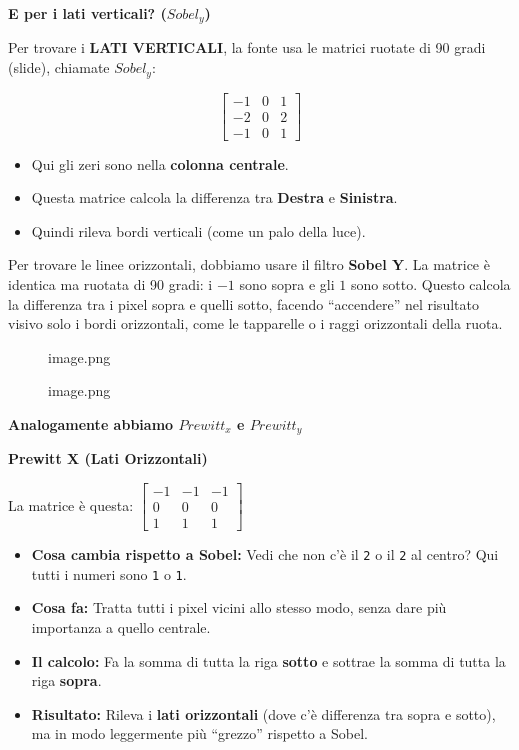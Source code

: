 \documentclass[
]{article}
\providecommand{\tightlist}{%
  \setlength{\itemsep}{0pt}\setlength{\parskip}{0pt}}
\begin{document}
\textbf{E per i lati verticali? (\(Sobel_y\))}

Per trovare i \textbf{LATI VERTICALI}, la fonte usa le matrici ruotate di 90 gradi (slide), chiamate \(Sobel_y\):

\[
\begin{bmatrix}
-1 & 0 & 1 \\
-2 & 0 & 2 \\
-1 & 0 & 1
\end{bmatrix}
\]

\begin{itemize}
\tightlist
\item
  Qui gli zeri sono nella \textbf{colonna centrale}.
\item
  Questa matrice calcola la differenza tra \textbf{Destra} e \textbf{Sinistra}.
\item
  Quindi rileva bordi verticali (come un palo della luce).
\end{itemize}

Per trovare le linee orizzontali, dobbiamo usare il filtro \textbf{Sobel Y}. La matrice è identica ma ruotata di 90 gradi: i \(-1\) sono sopra e gli \(1\) sono sotto. Questo calcola la differenza tra i pixel sopra e quelli sotto, facendo ``accendere'' nel risultato visivo solo i bordi orizzontali, come le tapparelle o i raggi orizzontali della ruota.

\begin{figure}
\centering
{image.png}
\caption{image.png}
\end{figure}

\textbf{Analogamente abbiamo \(Prewitt_x\) e \(Prewitt_y\)}

\textbf{Prewitt X (Lati Orizzontali)}

La matrice è questa: \(\begin{bmatrix} -1 & -1 & -1 \\ 0 & 0 & 0 \\ 1 & 1 & 1 \end{bmatrix}\)

\begin{itemize}
\tightlist
\item
  \textbf{Cosa cambia rispetto a Sobel:} Vedi che non c'è il \texttt{2} o il \texttt{2} al centro? Qui tutti i numeri sono \texttt{1} o \texttt{1}.
\item
  \textbf{Cosa fa:} Tratta tutti i pixel vicini allo stesso modo, senza dare più importanza a quello centrale.
\item
  \textbf{Il calcolo:} Fa la somma di tutta la riga \textbf{sotto} e sottrae la somma di tutta la riga \textbf{sopra}.
\item
  \textbf{Risultato:} Rileva i \textbf{lati orizzontali} (dove c'è differenza tra sopra e sotto), ma in modo leggermente più ``grezzo'' rispetto a Sobel.
\end{itemize}
\end{document}
